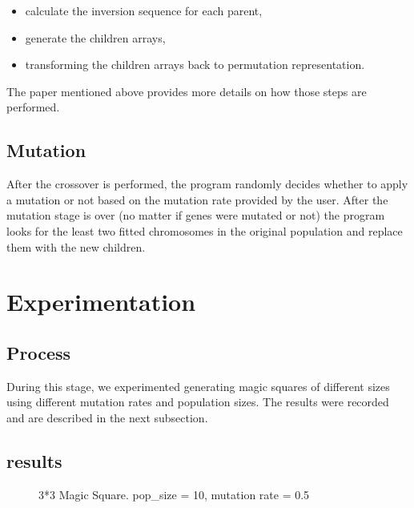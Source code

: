 \documentclass[12pt]{article}
\begin{document}
			\begin{itemize}
				\item calculate the inversion sequence for each parent,
				\item generate the children arrays,
				\item transforming the children arrays back to permutation representation.
			\end{itemize}
		The paper mentioned above provides more details on how those steps are performed.
		
		\subsection{Mutation}
		After the crossover is performed, the program randomly decides whether to apply a mutation or not based on the mutation rate provided by the user. After the mutation stage is over (no matter if genes were mutated or not) the program looks for the least two fitted chromosomes in the original population and replace them with the new children.
	\section{Experimentation}
		\subsection{Process}
			During this stage, we experimented generating magic squares of different sizes using different mutation rates and population sizes. The results were recorded and are described in the next subsection.
		\subsection{results}
			\begin{figure}[H]
				\hfill
				\hfill
				\hfill
				\caption{3*3 Magic Square. pop\_size = 10, mutation rate = 0.5}
			\end{figure}
		
\end{document}
